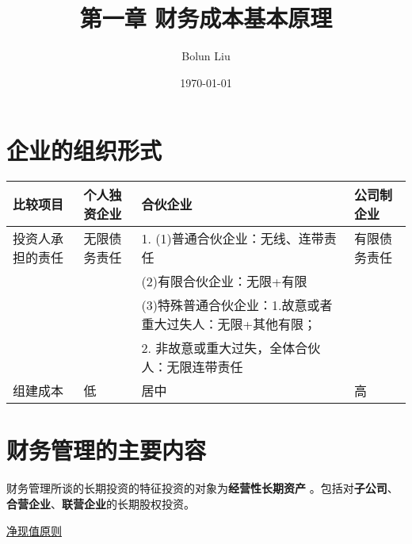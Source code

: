 \documentclass[12pt,a4paper]{article}
\author{Bolun Liu}
\date{\today}
\title{第一章 财务成本基本原理}
\begin{document}
\maketitle
\setcounter{tocdepth}{2}
\tableofcontents

\section{企业的组织形式}
\label{sec:orgf77c801}
\begin{center}
\begin{tabular}{llll}
比较项目 & 个人独资企业 & 合伙企业 & 公司制企业\\
\hline
投资人承担的责任 & 无限债务责任 & 1. (1)普通合伙企业：无线、连带责任 & 有限债务责任\\
 &  & (2)有限合伙企业：无限+有限 & \\
 &  & (3)特殊普通合伙企业：1.故意或者重大过失人：无限+其他有限； & \\
 &  & 2. 非故意或重大过失，全体合伙人：无限连带责任 & \\
\hline
组建成本 & 低 & 居中 & 高\\
\end{tabular}
\end{center}
\section{财务管理的主要内容}
\label{sec:org2140f5c}
财务管理所谈的长期投资的特征投资的对象为\textbf{经营性长期资产} 。包括对\textbf{子公司}、\textbf{合营企业}、\textbf{联营企业}的长期股权投资。

\uline{净现值原则}
\end{document}
